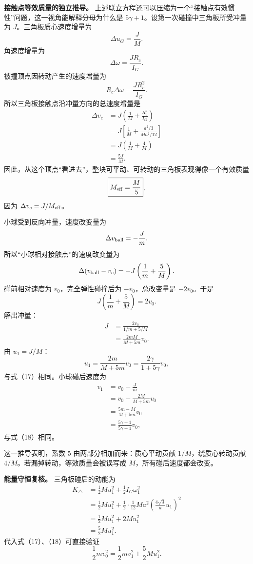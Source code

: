 \documentclass[12pt,a4paper,UTF8]{ctexart}
\begin{document}
\textbf{接触点等效质量的独立推导。}
上述联立方程还可以压缩为一个``接触点有效惯性''问题，这一视角能解释分母为什么是
\(5\gamma+1\)。设第一次碰撞中三角板所受冲量为
\(J\)。三角板质心速度增量为 \[
\Delta u_G=\frac JM.
\] 角速度增量为 \[
\Delta\omega=\frac{JR_c}{I_G}.
\] 被撞顶点因转动产生的速度增量为 \[
R_c\Delta\omega
=\frac{JR_c^2}{I_G}.
\] 所以三角板接触点沿冲量方向的总速度增量是 \[
\begin{aligned}
\Delta v_c
&=J\left(
\frac1M+\frac{R_c^2}{I_G}
\right)\\
&=J\left[
\frac1M
+\frac{a^2/3}{Ma^2/12}
\right]\\
&=J\left(
\frac1M+\frac4M
\right)\\
&=\frac{5J}{M}.
\end{aligned}
\]
因此，从这个顶点``看进去''，整块可平动、可转动的三角板表现得像一个有效质量
\[
\boxed{
M_{\rm eff}=\frac M5
},
\] 因为 \(\Delta v_c=J/M_{\rm eff}\)。

小球受到反向冲量，速度改变量为 \[
\Delta v_{\rm ball}=-\frac Jm.
\] 所以``小球相对接触点''的速度改变量为 \[
\Delta(v_{\rm ball}-v_c)
=-J\left(
\frac1m+\frac5M
\right).
\] 碰前相对速度为 \(v_0\)，完全弹性碰撞后为 \(-v_0\)，总改变量是
\(-2v_0\)。于是 \[
J\left(
\frac1m+\frac5M
\right)=2v_0.
\] 解出冲量： \[
\begin{aligned}
J
&=\frac{2v_0}{1/m+5/M}\\
&=\frac{2mM}{M+5m}v_0.
\end{aligned}
\] 由 \(u_1=J/M\)： \[
u_1
=\frac{2m}{M+5m}v_0
=\frac{2\gamma}{1+5\gamma}v_0,
\] 与式（17）相同。小球碰后速度为 \[
\begin{aligned}
v_1
&=v_0-\frac Jm\\
&=v_0-\frac{2M}{M+5m}v_0\\
&=\frac{5m-M}{M+5m}v_0\\
&=\frac{5\gamma-1}{5\gamma+1}v_0,
\end{aligned}
\] 与式（18）相同。

这一推导表明，系数 \(5\) 由两部分相加而来：质心平动贡献
\(1/M\)，绕质心转动贡献 \(4/M\)。若漏掉转动，等效质量会被误写成
\(M\)，所有碰后速度都会改变。

\textbf{能量守恒复核。} 三角板碰后的动能为 \[
\begin{aligned}
K_\triangle
&=\frac12Mu_1^2+\frac12I_G\omega_1^2\\
&=\frac12Mu_1^2
+\frac12\cdot\frac1{12}Ma^2
\left(\frac{4\sqrt3}{a}u_1\right)^2\\
&=\frac12Mu_1^2+2Mu_1^2\\
&=\frac52Mu_1^2.
\end{aligned} \tag{20}
\] 代入式（17）、（18）可直接验证 \[
\frac12mv_0^2
=\frac12mv_1^2+\frac52Mu_1^2. \tag{21}
\]
\end{document}
